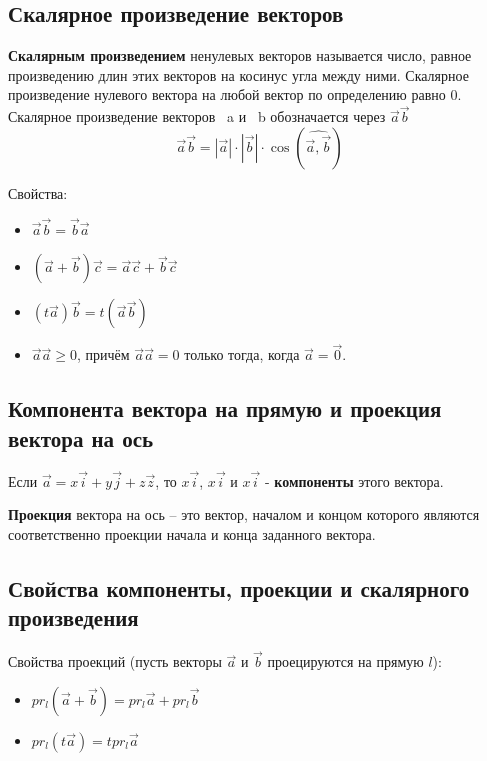 \documentclass[a4paper]{article}
\begin{document}
\newpage \begin{center}\begin{Large}\end{Large}\end{center}
\subsection*{Скалярное произведение векторов}

\textbf{Скалярным произведением} ненулевых векторов называется число, равное
произведению длин этих векторов на косинус угла между ними. Скалярное
произведение нулевого вектора на любой вектор по определению равно 0.
Скалярное произведение векторов ~a и ~b обозначается через $\vec{a} \vec{b}$
\begin{equation}
\vec{a} \vec{b} = |\vec{a}| \cdot | \vec{b} | \cdot \cos(\widehat{\vec{a}, \vec{b}})
\end{equation}

Свойства:
\begin{itemize}
\item $\vec{a} \vec{b} = \vec{b} \vec{a}$
\item $(\vec{a} + \vec{b}) \vec{c} = \vec{a} \vec{c} + \vec{b} \vec{c}$
\item $(t \vec{a}) \vec{b} = t (\vec{a} \vec{b})$
\item $\vec{a} \vec{a} \geq 0$, причём $\vec{a} \vec{a} = 0$ только тогда, когда $\vec{a} = \vec{0}$.
\end{itemize}

\subsection*{Компонента вектора на прямую и проекция вектора на ось
}
Если $\vec{a} = x \vec{i} + y \vec{j} + z \vec{z}$, то $x \vec{i}$, $x \vec{i}$ и $x \vec{i}$ - \textbf{компоненты} этого вектора.

\textbf{Проекция} вектора на ось – это вектор, началом и концом которого являются соответственно проекции начала и конца заданного вектора.

\subsection*{Свойства компоненты, проекции и скалярного произведения}

Свойства проекций (пусть векторы $\vec{a}$ и $\vec{b}$ проецируются на прямую $l$):
\begin{itemize}
\item $pr_l (\vec{a} + \vec{b}) = pr_l \vec{a} + pr_l \vec{b}$
\item $pr_l (t \vec{a}) = t pr_l \vec{a}$
\end{itemize}
\end{document}
